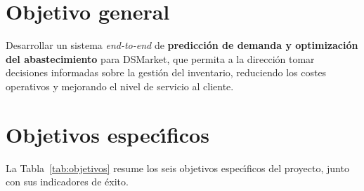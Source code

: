 \documentclass[12pt, a4paper, oneside]{report}
\begin{document}
\section{Objetivo general}

Desarrollar un sistema \textit{end-to-end} de \textbf{predicci\'on de demanda y optimizaci\'on del abastecimiento} para DSMarket, que permita a la direcci\'on tomar decisiones informadas sobre la gesti\'on del inventario, reduciendo los costes operativos y mejorando el nivel de servicio al cliente.

\section{Objetivos espec\'{\i}ficos}

La Tabla~\ref{tab:objetivos} resume los seis objetivos espec\'{\i}ficos del proyecto, junto con sus indicadores de \'exito.
\end{document}
